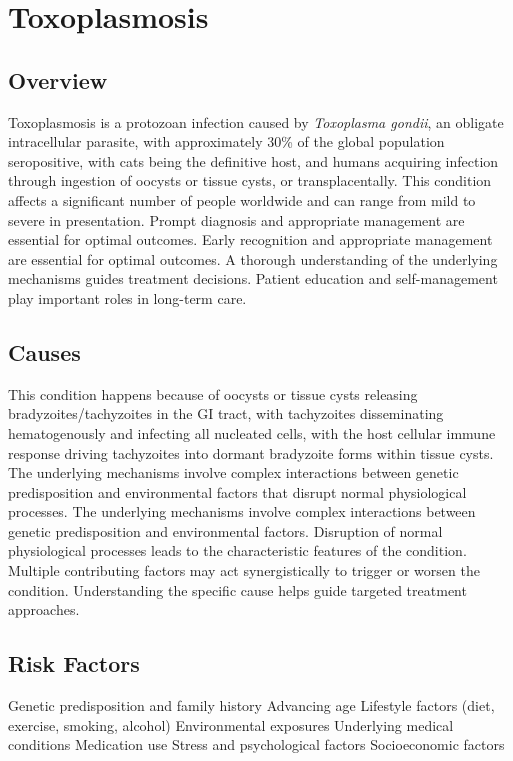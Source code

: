 \chapter{Toxoplasmosis}
\label{sec:Toxoplasmosis}

\section{Overview}
Toxoplasmosis is a protozoan infection caused by \textit{Toxoplasma gondii}, an obligate intracellular parasite, with approximately 30\% of the global population seropositive, with cats being the definitive host, and humans acquiring infection through ingestion of oocysts or tissue cysts, or transplacentally. This condition affects a significant number of people worldwide and can range from mild to severe in presentation. Prompt diagnosis and appropriate management are essential for optimal outcomes. Early recognition and appropriate management are essential for optimal outcomes. A thorough understanding of the underlying mechanisms guides treatment decisions. Patient education and self-management play important roles in long-term care.
\section{Causes}
This condition happens because of oocysts or tissue cysts releasing bradyzoites/tachyzoites in the GI tract, with tachyzoites disseminating hematogenously and infecting all nucleated cells, with the host cellular immune response driving tachyzoites into dormant bradyzoite forms within tissue cysts. The underlying mechanisms involve complex interactions between genetic predisposition and environmental factors that disrupt normal physiological processes. The underlying mechanisms involve complex interactions between genetic predisposition and environmental factors. Disruption of normal physiological processes leads to the characteristic features of the condition. Multiple contributing factors may act synergistically to trigger or worsen the condition. Understanding the specific cause helps guide targeted treatment approaches.
\section{Risk Factors}
Genetic predisposition and family history Advancing age Lifestyle factors (diet, exercise, smoking, alcohol) Environmental exposures Underlying medical conditions Medication use Stress and psychological factors Socioeconomic factors

